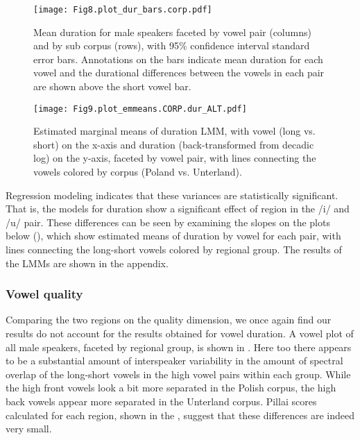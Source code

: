\documentclass[output=paper,colorlinks,citecolor=brown]{langscibook}
\begin{document}
  
\begin{figure}[t]
\texttt{[image: Fig8.plot\_dur\_bars.corp.pdf]}
\caption{\label{fig:nove:8} Mean duration for male speakers faceted by vowel pair (columns) and by sub corpus (rows), with 95\% confidence interval standard error bars. Annotations on the bars indicate mean duration for each vowel and the durational differences between the vowels in each pair are shown above the short vowel bar.}
\end{figure}

\begin{figure}[b]
\texttt{[image: Fig9.plot\_emmeans.CORP.dur\_ALT.pdf]}
\caption{\label{fig:nove:9} Estimated marginal means of duration LMM, with vowel (long vs. short) on the x-axis and duration (back-transformed from decadic log) on the y-axis, faceted by vowel pair, with lines connecting the vowels colored by corpus (Poland vs. Unterland).}
\end{figure}

Regression modeling indicates that these variances are statistically significant. That is, the models for duration show a significant effect of region in the \mbox{/i/} and \mbox{/u/} pair. These differences can be seen by examining the slopes on the plots below (), which show estimated means of duration by vowel for each pair, with lines connecting the long-short vowels colored by regional group. The results of the LMMs are shown in the appendix.

\clearpage

\subsubsection{Vowel quality}
\label{sec:nove:5.2.2}

Comparing the two regions on the quality dimension, we once again find our results do not account for the results obtained for vowel duration. A vowel plot of all male speakers, faceted by regional group, is shown in . Here too there appears to be a substantial amount of interspeaker variability in the amount of spectral overlap of the long-short vowels in the high vowel pairs within each group. While the high front vowels look a bit more separated in the Polish corpus, the high back vowels appear more separated in the Unterland corpus. Pillai scores calculated for each region, shown in the , suggest that these differences are indeed very small.
\end{document}
